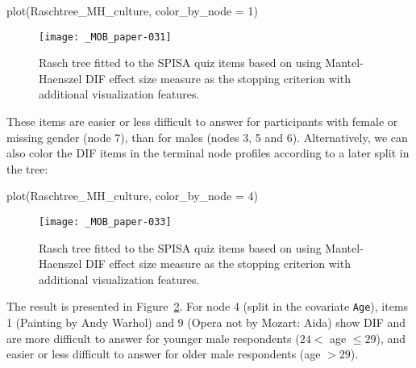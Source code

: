 \documentclass[doc,floatsintext,natbib]{apa7}
\begin{document}
\begin{Schunk}
\begin{Sinput}
 plot(Raschtree_MH_culture, color_by_node = 1)
\end{Sinput}
\end{Schunk}

\begin{figure}%
\caption{Rasch tree fitted to the SPISA quiz items based on using Mantel-Haenszel DIF effect size measure as the stopping criterion with additional visualization features.}
\texttt{[image: \_MOB\_paper-031]}
\label{fig:MHtree3}
\end{figure}%

These items are %
easier or less difficult to answer for participants with female or missing gender (node 7), than for males (nodes 3, 5 and 6). Alternatively, we can also color the DIF items in the terminal node profiles according to a later split in the tree:





\begin{Schunk}
\begin{Sinput}
 plot(Raschtree_MH_culture, color_by_node = 4)
\end{Sinput}
\end{Schunk}


\begin{figure}%
\caption{Rasch tree fitted to the SPISA quiz items based on using Mantel-Haenszel DIF effect size measure as the stopping criterion with additional visualization features.}
\texttt{[image: \_MOB\_paper-033]}
\label{fig:MHtree4}
\end{figure}%

The result is presented in Figure~\ref{fig:MHtree4}. For node 4 (split in the covariate \texttt{Age}), items 1 (Painting by Andy Warhol) and 9 (Opera not by Mozart: Aida) show DIF and are %
more difficult to answer for younger male respondents ($24 <$ age $\leq 29$), and easier or less difficult to answer for older male respondents (age $>29$).
\end{document}
